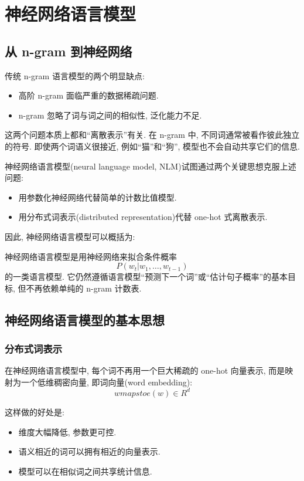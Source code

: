 \chapter{神经网络语言模型}


\section{从 n-gram 到神经网络}


传统 n-gram 语言模型的两个明显缺点:

\begin{itemize}
\item 高阶 n-gram 面临严重的数据稀疏问题.
\item n-gram 忽略了词与词之间的相似性, 泛化能力不足.
\end{itemize}

这两个问题本质上都和“离散表示”有关.
在 n-gram 中, 不同词通常被看作彼此独立的符号.
即使两个词语义很接近, 例如“猫”和“狗”, 模型也不会自动共享它们的信息.

神经网络语言模型(neural language model, NLM)试图通过两个关键思想克服上述问题:

\begin{itemize}
\item 用参数化神经网络代替简单的计数比值模型.
\item 用分布式词表示(distributed representation)代替 one-hot 式离散表示.
\end{itemize}

因此, 神经网络语言模型可以概括为:

神经网络语言模型是用神经网络来拟合条件概率
\[
P(w_t | w_1, \dots, w_{t-1})
\]
的一类语言模型.
它仍然遵循语言模型“预测下一个词”或“估计句子概率”的基本目标,
但不再依赖单纯的 n-gram 计数表.

\section{神经网络语言模型的基本思想}


\subsection{分布式词表示}


在神经网络语言模型中, 每个词不再用一个巨大稀疏的 one-hot 向量表示,
而是映射为一个低维稠密向量, 即词向量(word embedding):
\[
w mapsto e(w) \in R^d
\]

这样做的好处是:

\begin{itemize}
\item 维度大幅降低, 参数更可控.
\item 语义相近的词可以拥有相近的向量表示.
\item 模型可以在相似词之间共享统计信息.
\end{itemize}


